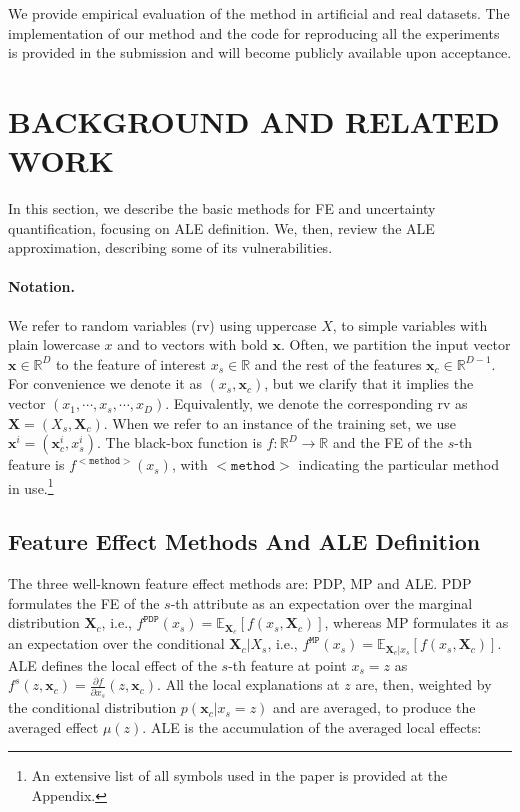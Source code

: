 \documentclass[twoside]{article}
\newcommand{\xc}{\mathbf{x}_c}
\newcommand{\xb}{\mathbf{x}}
\begin{document}
We provide empirical evaluation of the method in artificial and real
datasets. The implementation of our method and the code for
reproducing all the experiments is provided in the submission and will
become publicly available upon acceptance.


\section{BACKGROUND AND RELATED WORK}

In this section, we describe the basic methods for FE and uncertainty
quantification, focusing on ALE definition. We, then, review the ALE
approximation\citep{apley2020visualizing, gkolemis22}, describing some
of its vulnerabilities.

\paragraph{Notation.} We refer to random variables (rv) using
uppercase \( X \), to simple variables with plain lowercase \( x \)
and to vectors with bold \( \xb \). Often, we partition the input
vector \(\xb \in \mathbb{R}^D\) to the feature of interest
\(x_s \in \mathbb{R} \) and the rest of the features
\(\xc \in \mathbb{R}^{D-1}\). For convenience we denote it as
\((x_s, \mathbf{x}_c)\), but we clarify that it implies the vector
\((x_1, \cdots , x_s, \cdots, x_D)\). Equivalently, we denote the
corresponding rv as \(\mathbf{X} = (X_s, \mathbf{X}_c)\). When we
refer to an instance of the training set, we use
\(\xb^i= (\xc^i, x_s^i) \). The black-box function is
\(f : \mathbb{R}^D \rightarrow \mathbb{R}\) and the FE of the \(s\)-th
feature is \(f^{\mathtt{<method>}}(x_s)\), with \(\mathtt{<method>}\)
indicating the particular method in use.\footnote{An extensive list of all
  symbols used in the paper is provided at the Appendix.}

\subsection{Feature Effect Methods And ALE Definition}
\label{sec:feat-effect-meth}

The three well-known feature effect methods are: PDP, MP and ALE. PDP
formulates the FE of the \(s\)-th attribute as an expectation over the
marginal distribution \(\mathbf{X}_c\), i.e.,
\(f^{\mathtt{PDP}}(x_s) =
\mathbb{E}_{\mathbf{X}_c}[f(x_s,\mathbf{X}_c)]\), whereas MP
formulates it as an expectation over the conditional
\(\mathbf{X}_c|X_s\), i.e.,
\(f^{\mathtt{MP}}(x_s) = \mathbb{E}_{\mathbf{X}_c|x_s}[f(x_s,
\mathbf{X}_c)]\). ALE defines the local effect of the \(s\)-th feature
at point \(x_s = z\) as
\(f^s(z, \xc) = \frac{\partial f}{\partial x_s} (z, \xc)\). All the
local explanations at \(z\) are, then, weighted by the conditional
distribution \(p(\xc|x_s=z)\) and are averaged, to produce the
averaged effect \(\mu(z)\). ALE is the accumulation of the averaged
local effects:
\end{document}
